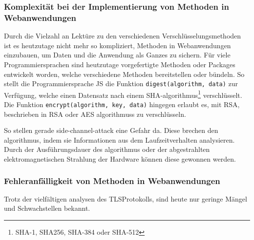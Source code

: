 \subsubsection[Komplexität bei der Implementierung von kryptografischen Methoden]{Komplexität bei der Implementierung von  Methoden in Webanwendungen}\label{subsubsec:komplexitaet_bei_der_implementierung_von_Kryptografischen_methoden_in_webanwendungen}
Durch die Vielzahl an Lektüre zu den verschiedenen Verschlüsselungsmethoden\autocites[\zb][]{davies2011implementing} ist es heutzutage nicht mehr so kompliziert,  Methoden in Webanwendungen einzubauen, um Daten und die Anwendung als Ganzes zu sichern.
Für viele Programmiersprachen sind heutzutage vorgefertigte Methoden oder Packages entwickelt worden, welche verschiedene  Methoden bereitstellen oder bündeln.
So stellt die Programmiersprache \ac{JS} die Funktion \lstinline!digest(algorithm, data)! zur Verfügung, welche einen Datensatz nach einem \ac{SHA}-\gls{algorithmus}\footnote{\ac{SHA}-1, \gls{SHA256}, \ac{SHA}-384 oder \ac{SHA}-512} verschlüsselt.\autocite[\vglf][]{SubtleCr83:online}
Die Funktion \lstinline!encrypt(algorithm, key, data)! hingegen erlaubt es, mit RSA, beschrieben in \ac{RSA} oder \ac{AES} \glspl{algorithmus} zu verschlüsseln.

\begin{samepage}
So stellen gerade \gls{side-channel-attack} eine Gefahr da.
Diese brechen den  \gls{algorithmus}, indem sie Informationen aus dem Laufzeitverhalten analysieren.
Durch \ua der Ausführungsdauer des \gls{algorithmus} oder der abgestrahlten elektromagnetischen Strahlung der Hardware können diese gewonnen werden.\autocite[\vglf][]{10.1145/1315245.1315282}
\end{samepage}

\subsubsection[Fehleranfälligkeit von kryptografischen Methoden in Webanwendungen]{Fehleranfälligkeit von  Methoden in Webanwendungen}\label{subsubsec:fehleranfaelligkeit_von_Kryptografischen_methoden_in_webanwendungen}
Trotz der vielfältigen analysen des \ac{TLS}\nonbreakdash Protokolls\autocites[Siehe \zb][]{krawczyk2013security, paulson1999inductive, dowling2015cryptographic, cremers2017comprehensive}, sind heute nur geringe Mängel und Schwachstellen bekannt.\autocite[\vglf][]{OPPLIGER20062238}

